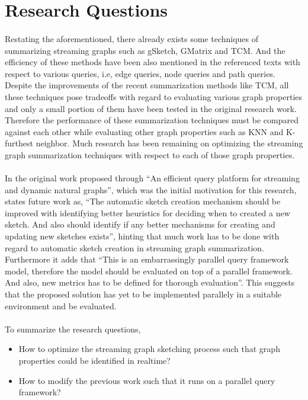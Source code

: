 \section{Research Questions}

\paragraph{}
Restating the aforementioned, there already exists some techniques of
summarizing streaming graphs such as gSketch, GMatrix and TCM. And the 
efficiency of these methods have been also mentioned in the referenced 
texts with respect to various queries, i.e, edge queries, node queries 
and path queries. Despite the improvements of the recent summarization 
methods like TCM, all these techniques pose tradeoffs with regard to 
evaluating various graph properties and only a small portion of them have 
been tested in the original research work. Therefore the performance of 
these summarization techniques must be compared against each other while 
evaluating other graph properties such as  KNN and K-furthest neighbor. 
Much research has been remaining on optimizing the streaming graph summarization 
techniques with respect to each of those graph properties. 

\paragraph{}
In the original work proposed through “An efficient query platform for 
streaming and dynamic natural graphs”\cite{kumarage_efficient_2017}, which 
was the initial motivation for this research, states future work as, 
“The automatic sketch creation mechanism should be improved with identifying 
better heuristics for deciding when to created a new sketch. And also should 
identify if any better mechanisms for creating and updating new sketches exists”, 
hinting that much work has to be done with regard to automatic sketch creation in 
streaming graph summarization. Furthermore it adds that 
“This is an embarrassingly parallel query framework model, therefore 
the model should be evaluated on top of a parallel framework. And also, 
new metrics has to be defined for thorough evaluation”. This suggests that 
the proposed solution has yet to be implemented parallely in a suitable 
environment and be evaluated. 

\paragraph{}
To summarize the research questions, 
\begin{itemize}
    \item How to optimize the streaming graph sketching process such that 
        graph properties could be identified in realtime?
    \item How to modify the previous work\cite{kumarage_efficient_2017} such that
        it runs on a parallel query framework?
\end{itemize}